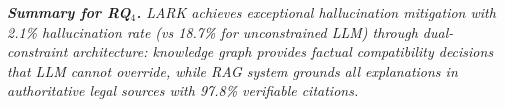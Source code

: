 
\begin{table}[ht]
\centering
\caption{Hallucination Mitigation Analysis}
\label{tab:hallucination-mitigation}
\end{table}

\begin{boxK}
\textit{\textbf{Summary for RQ$_4$.} LARK achieves exceptional hallucination mitigation with 2.1\% hallucination rate (vs 18.7\% for unconstrained LLM) through dual-constraint architecture: knowledge graph provides factual compatibility decisions that LLM cannot override, while RAG system grounds all explanations in authoritative legal sources with 97.8\% verifiable citations.}
\end{boxK}

